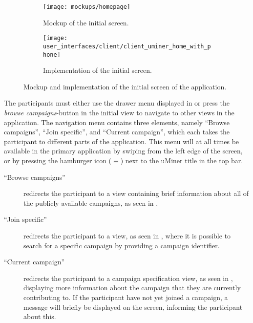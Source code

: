 \begin{figure}[!htbp]
    \begin{subfigure}[!t]{.48\textwidth}
        \centering
        \texttt{[image: mockups/homepage]}
        \caption{Mockup of the initial screen.}
        \label{fig:mockup_initial_screen}
    \end{subfigure}%
    \begin{subfigure}[!t]{.52\textwidth}
    \centering
        \texttt{[image: user\_interfaces/client/client\_uminer\_home\_with\_phone]}
        \caption{Implementation of the initial screen.}
        \label{fig:implementation_initial_screen}
    \end{subfigure}
    \caption{Mockup and implementation of the initial screen of the application.}
    \label{fig:initial_screen}
\end{figure}
\FloatBarrier

The participants must either use the drawer menu displayed in  or press the \emph{browse campaigns}-button in the initial view to navigate to other views in the application. The navigation menu contains three elements, namely ``Browse campaigns'', ``Join specific'', and ``Current campaign'', which each takes the participant to different parts of the application. This menu will at all times be available in the primary application by swiping from the left edge of the screen, or by pressing the hamburger icon ($\equiv$) next to the uMiner title in the top bar. 

\begin{description}
    \item[``Browse campaigns''] redirects the participant to a view containing brief information about all of the publicly available campaigns, as seen in .

    \item[``Join specific''] redirects the participant to a view, as seen in , where it is possible to search for a specific campaign by providing a campaign identifier.

    \item[``Current campaign''] redirects the participant to a campaign specification view, as seen in , displaying more information about the campaign that they are currently contributing to. If the participant have not yet joined a campaign, a message will briefly be displayed on the screen, informing the participant about this.
\end{description}

